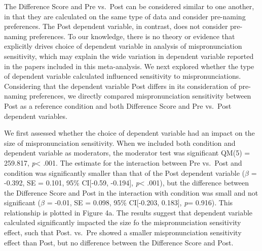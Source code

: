 \documentclass[man]{apa6}
\theoremstyle{definition}
\theoremstyle{definition}
\theoremstyle{definition}
\theoremstyle{remark}
\begin{document}
The Difference Score and Pre vs.~Post can be considered similar to one
another, in that they are calculated on the same type of data and
consider pre-naming preferences. The Post dependent variable, in
contrast, does not consider pre-naming preferences. To our knowledge,
there is no theory or evidence that explicitly drives choice of
dependent variable in analysis of mispronunciation sensitivity, which
may explain the wide variation in dependent variable reported in the
papers included in this meta-analysis. We next explored whether the type
of dependent variable calculated influenced sensitivity to
mispronunciations. Considering that the dependent variable Post differs
in its consideration of pre-naming preferences, we directly compared
mispronunciation sensitivity between Post as a reference condition and
both Difference Score and Pre vs.~Post dependent variables.

We first assessed whether the choice of dependent variable had an impact
on the size of mispronunciation sensitivity. When we included both
condition and dependent variable as moderators, the moderator test was
significant QM(5) = 259.817, \emph{p}\textless{} .001. The estimate for
the interaction between Pre vs.~Post and condition was significantly
smaller than that of the Post dependent variable (\(\beta\) = -0.392, SE
= 0.101, 95\% CI{[}-0.59, -0.194{]}, \emph{p}\textless{} .001), but the
difference between the Difference Score and Post in the interaction with
condition was small and not significant (\(\beta\) = -0.01, SE = 0.098,
95\% CI{[}-0.203, 0.183{]}, \emph{p}= 0.916). This relationship is
plotted in Figure 4a. The results suggest that dependent variable
calculated significantly impacted the size fo the mispronunciation
sensitivity effect, such that Post. vs.~Pre showed a smaller
mispronunciation sensitivity effect than Post, but no difference between
the Difference Score and Post.
\end{document}
